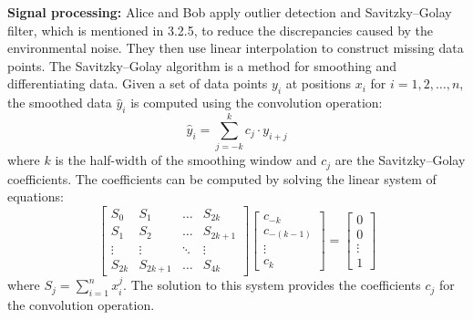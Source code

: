 \textbf{Signal processing:} Alice and Bob apply outlier detection and Savitzky–Golay filter, which is mentioned in 3.2.5, to reduce the discrepancies caused by the environmental noise. They then use linear interpolation to construct missing data points. The Savitzky–Golay algorithm is a method for smoothing and differentiating data. Given a set of data points \(y_i\) at positions \(x_i\) for \(i = 1, 2, \ldots, n\), the smoothed data \(\hat{y}_i\) is computed using the convolution operation:
\begin{equation}
\hat{y}_i = \sum_{j = -k}^{k} c_j \cdot y_{i+j}
\end{equation}
where \(k\) is the half-width of the smoothing window and \(c_j\) are the Savitzky–Golay coefficients. The coefficients can be computed by solving the linear system of equations:
\begin{equation}
\begin{bmatrix}
  S_0 & S_1 & \ldots & S_{2k} \\
  S_1 & S_2 & \ldots & S_{2k+1} \\
  \vdots & \vdots & \ddots & \vdots \\
  S_{2k} & S_{2k+1} & \ldots & S_{4k}
\end{bmatrix}
\begin{bmatrix}
  c_{-k} \\
  c_{-(k-1)} \\
  \vdots \\
  c_k
\end{bmatrix}
=
\begin{bmatrix}
  0 \\
  0 \\
  \vdots \\
  1
\end{bmatrix}
\end{equation}
where \(S_j = \sum_{i=1}^{n} x_i^j\). The solution to this system provides the coefficients \(c_j\) for the convolution operation.

